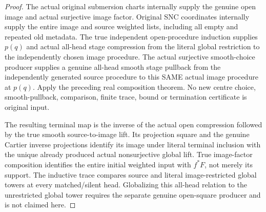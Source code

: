 \begin{proof}
The actual original submersion charts internally supply the genuine open image and actual surjective image factor. Original SNC coordinates internally supply the entire image and source weighted lists, including all empty and repeated old metadata. The true independent open-procedure induction supplies $p(q)$ and actual all-head stage compression from the literal global restriction to the independently chosen image procedure. The actual surjective smooth-choice producer supplies a genuine all-head smooth stage pullback from the independently generated source procedure to this SAME actual image procedure at $p(q)$. Apply the preceding real composition theorem. No new centre choice, smooth-pullback, comparison, finite trace, bound or termination certificate is original input.

The resulting terminal map is the inverse of the actual open compression followed by the true smooth source-to-image lift. Its projection square and the genuine Cartier inverse projections identify its image under literal terminal inclusion with the unique already produced actual nonsurjective global lift. True image-factor composition identifies the entire initial weighted input with $f^*F$, not merely its support. The inductive trace compares source and literal image-restricted global towers at every matched/silent head. Globalizing this all-head relation to the unrestricted global tower requires the separate genuine open-square producer and is not claimed here.
\end{proof}

